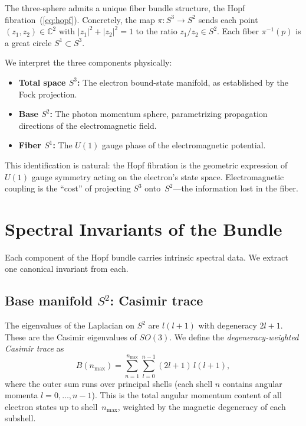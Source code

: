 \documentclass[aps,prl,twocolumn,superscriptaddress]{revtex4-2}
\begin{document}
The three-sphere admits a unique fiber bundle structure, the Hopf
fibration~(\ref{eq:hopf}). Concretely, the map
$\pi: S^3 \to S^2$ sends each point $(z_1, z_2) \in \mathbb{C}^2$
with $|z_1|^2 + |z_2|^2 = 1$ to the ratio $z_1/z_2 \in S^2$. Each
fiber $\pi^{-1}(p)$ is a great circle $S^1 \subset S^3$.

We interpret the three components physically:
\begin{itemize}
\item \textbf{Total space $S^3$:} The electron bound-state manifold,
  as established by the Fock projection.
\item \textbf{Base $S^2$:} The photon momentum sphere, parametrizing
  propagation directions of the electromagnetic field.
\item \textbf{Fiber $S^1$:} The $U(1)$ gauge phase of the
  electromagnetic potential.
\end{itemize}

This identification is natural: the Hopf fibration is the geometric
expression of $U(1)$ gauge symmetry acting on the electron's state
space. Electromagnetic coupling is the ``cost'' of projecting $S^3$
onto~$S^2$---the information lost in the fiber.


\section{Spectral Invariants of the Bundle}

Each component of the Hopf bundle carries intrinsic spectral data. We
extract one canonical invariant from each.

\subsection{Base manifold $S^2$: Casimir trace}

The eigenvalues of the Laplacian on $S^2$ are $l(l+1)$ with
degeneracy $2l+1$. These are the Casimir eigenvalues of $SO(3)$. We
define the \textit{degeneracy-weighted Casimir trace} as
\begin{equation}\label{eq:casimir}
  B(n_{\max}) = \sum_{n=1}^{n_{\max}} \sum_{l=0}^{n-1}
  (2l+1)\,l(l+1),
\end{equation}
where the outer sum runs over principal shells (each shell $n$
contains angular momenta $l = 0, \ldots, n-1$). This is the total
angular momentum content of all electron states up to
shell~$n_{\max}$, weighted by the magnetic degeneracy of each
subshell.
\end{document}
